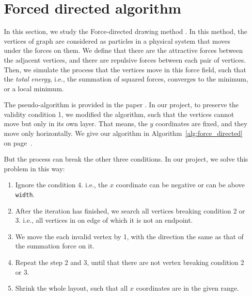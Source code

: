 \section{Forced directed algorithm}
\label{chapter3}


In this section, we study the Force-directed drawing method \cite{hu2006}.
In this method, the vertices of graph are considered as particles in a physical system that moves under the forces on them. 
We define that there are the attractive forces between the adjacent vertices, and there are repulsive forces between each pair of vertices.
Then, we simulate the process that the vertices move in this force field, such that the \textit{total energy}, i.e., the summation of squared forces, converges to the minimum, or a local minimum.


The pseudo-algorithm is provided in the paper \cite{hu2006}. 
In our project, to preserve the validity condition 1, we modified the algorithm, such that the vertices cannot move but only in its own layer. That means, the $y$ coordinates are fixed, and they move only horizontally. We give our algorithm in Algorithm~\ref{alg:force_directed} on page~\pageref{alg:force_directed}.

But the process can break the other three conditions. In our project, we solve this problem in this way:
\begin{enumerate}
    \item Ignore the condition 4. i.e., the $x$ coordinate can be negative or can be above \lstinline{width}.
    \item After the iteration has finished, we search all vertices breaking condition 2 or 3. i.e., all vertices in on edge of which it is not an endpoint.
    \item We move the each invalid vertex by 1, with the direction the same as that of the summation force on it.
    \item Repeat the step 2 and 3, until that there are not vertex breaking condition 2 or 3.
    \item Shrink the whole layout, such that all $x$ coordinates are in the given range.
\end{enumerate}

